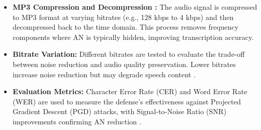 \documentclass[a4paper,12pt]{article}
\begin{document}
\begin{itemize}
    \item \textbf{MP3 Compression and Decompression \cite{andronic2020mp3}:} The audio signal is compressed to MP3 format at varying bitrates (e.g., 128 kbps to 4 kbps) and then decompressed back to the time domain. This process removes frequency components where AN is typically hidden, improving transcription accuracy.
    \item \textbf{Bitrate Variation:} Different bitrates are tested to evaluate the trade-off between noise reduction and audio quality preservation. Lower bitrates increase noise reduction but may degrade speech content \cite{andronic2020mp3}.
    \item \textbf{Evaluation Metrics:} Character Error Rate (CER) and Word Error Rate (WER) are used to measure the defense's effectiveness against Projected Gradient Descent (PGD) attacks, with Signal-to-Noise Ratio (SNR) improvements confirming AN reduction \cite{andronic2020mp3}.
\end{itemize}

\newpage
\end{document}

